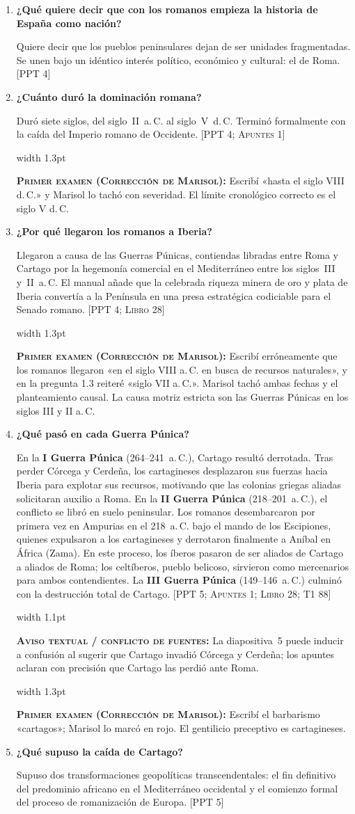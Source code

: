 \documentclass[11pt,letterpaper]{article}
\newcommand{\fuente}[1]{\nolinebreak\hfill{\footnotesize\color{black!55}\textsc{[#1]}}}
\newcommand{\examen}[1]{%
  \par\vspace{0.35em}%
  \noindent\hspace*{0.8em}%
  {\color{goodingCrimson}\vrule width 1.3pt}\hspace{0.7em}%
  \parbox{\dimexpr\linewidth-2.2em}{%
    \footnotesize\color{goodingCrimson}%
    \textbf{\textsc{Primer examen (Corrección de Marisol):}} #1%
  }%
  \par\vspace{0.35em}%
}
\newcommand{\aviso}[1]{%
  \par\vspace{0.3em}%
  \noindent\hspace*{0.8em}%
  {\color{black!40}\vrule width 1.1pt}\hspace{0.7em}%
  \parbox{\dimexpr\linewidth-2.2em}{%
    \footnotesize\color{black!75}%
    \textbf{\textsc{Aviso textual / conflicto de fuentes:}} #1%
  }%
  \par\vspace{0.3em}%
}
\newcommand{\preg}[1]{\item \textbf{#1}\par\nopagebreak\vspace{0.2em}}
\begin{document}
\begin{enumerate}
  \preg{¿Qué quiere decir que con los romanos empieza la historia de España como nación?}
  Quiere decir que los pueblos peninsulares dejan de ser unidades fragmentadas. Se unen bajo un idéntico interés político, económico y cultural: el de Roma. \fuente{PPT 4}

  \preg{¿Cuánto duró la dominación romana?}
  Duró siete siglos, del siglo~II~a.\,C. al siglo~V~d.\,C. Terminó formalmente con la caída del Imperio romano de Occidente. \fuente{PPT 4; Apuntes 1}
  \examen{Escribí «hasta el siglo VIII d.\,C.» y Marisol lo tachó con severidad. El límite cronológico correcto es el siglo V d.\,C.}

  \preg{¿Por qué llegaron los romanos a Iberia?}
  Llegaron a causa de las Guerras Púnicas, contiendas libradas entre Roma y Cartago por la hegemonía comercial en el Mediterráneo entre los siglos~III y~II~a.\,C. El manual añade que la celebrada riqueza minera de oro y plata de Iberia convertía a la Península en una presa estratégica codiciable para el Senado romano. \fuente{PPT 4; Libro 28}
  \examen{Escribí erróneamente que los romanos llegaron «en el siglo VIII a.\,C. en busca de recursos naturales», y en la pregunta 1.3 reiteré «siglo VII a.\,C.». Marisol tachó ambas fechas y el planteamiento causal. La causa motriz estricta son las Guerras Púnicas en los siglos III y II a.\,C.}

  \preg{¿Qué pasó en cada Guerra Púnica?}
  En la \textbf{I Guerra Púnica} (264--241~a.\,C.), Cartago resultó derrotada. Tras perder Córcega y Cerdeña, los cartagineses desplazaron sus fuerzas hacia Iberia para explotar sus recursos, motivando que las colonias griegas aliadas solicitaran auxilio a Roma. En la \textbf{II Guerra Púnica} (218--201~a.\,C.), el conflicto se libró en suelo peninsular. Los romanos desembarcaron por primera vez en Ampurias en el 218~a.\,C. bajo el mando de los Escipiones, quienes expulsaron a los cartagineses y derrotaron finalmente a Aníbal en África (Zama). En este proceso, los íberos pasaron de ser aliados de Cartago a aliados de Roma; los celtíberos, pueblo belicoso, sirvieron como mercenarios para ambos contendientes. La \textbf{III Guerra Púnica} (149--146~a.\,C.) culminó con la destrucción total de Cartago. \fuente{PPT 5; Apuntes 1; Libro 28; T1 88}
  \aviso{La diapositiva~5 puede inducir a confusión al sugerir que Cartago invadió Córcega y Cerdeña; los apuntes aclaran con precisión que Cartago las perdió ante Roma.}
  \examen{Escribí el barbarismo «cartagos»; Marisol lo marcó en rojo. El gentilicio preceptivo es cartagineses.}

  \preg{¿Qué supuso la caída de Cartago?}
  Supuso dos transformaciones geopolíticas transcendentales: el fin definitivo del predominio africano en el Mediterráneo occidental y el comienzo formal del proceso de romanización de Europa. \fuente{PPT 5}
\end{enumerate}
\end{document}
